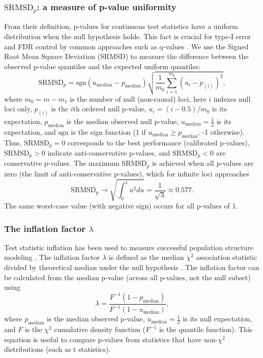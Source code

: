 \documentclass[11pt]{article}
\newcommand{\rmsd}{\text{SRMSD}_p}
\begin{document}
\subsubsection{$\rmsd$: a measure of p-value uniformity}

From their definition, p-values for continuous test statistics have a uniform distribution when the null hypothesis holds.
This fact is crucial for type-I error and FDR control by common approaches such as q-values \citep{storey_positive_2003, storey_statistical_2003}.
We use the Signed Root Mean Square Deviation (SRMSD) to measure the difference between the observed p-value quantiles and the expected uniform quantiles:
$$
\rmsd
=
\text{sgn}(u_\text{median} - p_\text{median} ) \sqrt{ \frac{1}{m_0} \sum_{i = 1}^{m_0} \left( u_i - p_{(i)} \right)^2 },
$$
where
$m_0 = m - m_1$ is the number of null (non-causal) loci,
here $i$ indexes null loci only,
$p_{(i)}$ is the $i$th ordered null p-value,
$u_i = ( i - 0.5 ) / m_0$ is its expectation,
$p_\text{median}$ is the median observed null p-value,
$u_\text{median} = \frac{1}{2}$ is its expectation,
and $\text{sgn}$ is the sign function (1 if $u_\text{median} \ge p_\text{median}$, -1 otherwise).
Thus, $\rmsd = 0$ corresponds to the best performance (calibrated p-values), $\rmsd > 0$ indicate anti-conservative p-values, and $\rmsd < 0$ are conservative p-values.
The maximum $\rmsd$ is achieved when all p-values are zero (the limit of anti-conservative p-values), which for infinite loci approaches
$$
\rmsd
\rightarrow
\sqrt{ \int_0^1 u^2 du }
=
\frac{1}{ \sqrt{ 3 } }
\approx
0.577
.
$$
The same worst-case value (with negative sign) occurs for all p-values of 1.

\subsubsection{The inflation factor $\lambda$}

Test statistic inflation has been used to measure successful population structure modeling \citep{astle_population_2009, price_new_2010}.
The inflation factor $\lambda$ is defined as the median $\chi^2$ association statistic divided by theoretical median under the null hypothesis \citep{devlin_genomic_1999}.
The inflation factor can be calculated from the median p-value (across all p-values, not the null subset) using
$$
\lambda
=
\frac{
  F^{-1} \left( 1 - p_\text{median} \right)
}{
  F^{-1} \left( 1 - u_\text{median} \right)
}
,
$$
where $p_\text{median}$ is the median observed p-value,
$u_\text{median} = \frac{1}{2}$ is its null expectation,
and $F$ is the $\chi^2$ cumulative density function ($F^{-1}$ is the quantile function).
This equation is useful to compare p-values from statistics that have non-$\chi^2$ distributions (such as t statistics).
\end{document}
